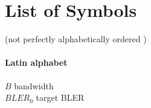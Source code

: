 














\newcommand\mytab{\tab \hspace{-5cm}}




\chapter*{List of Symbols} 
(not perfectly alphabetically ordered )

\subsubsection*{Latin alphabet}


$B$ \mytab bandwidth \\
$BLER_0$ \mytab target \acs{BLER} \\




